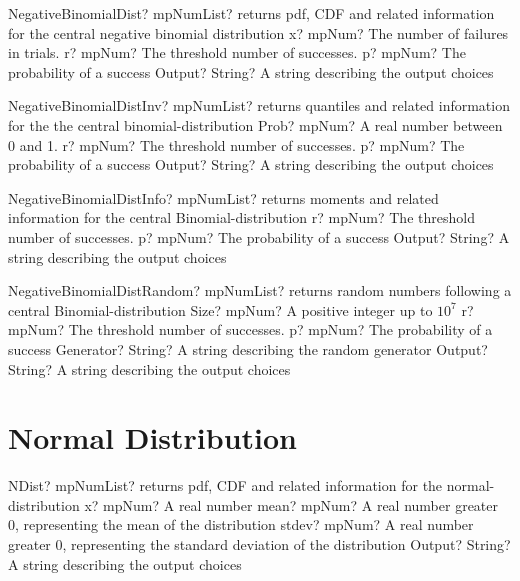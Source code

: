 \documentclass[12pt,a4paper,openany]{book}
\begin{document}
\begin{mpFunctionsExtract}
\mpFunctionFour
{NegativeBinomialDist? mpNumList? returns pdf, CDF and related information for the central negative binomial distribution}
{x? mpNum? The number of failures in trials.}
{r? mpNum? The threshold number of successes.}
{p? mpNum? The probability of a success}
{Output? String? A string describing the output choices}
\end{mpFunctionsExtract}

\begin{mpFunctionsExtract}
\mpFunctionFour
{NegativeBinomialDistInv? mpNumList? returns quantiles and related information for the the central binomial-distribution}
{Prob? mpNum? A real number between 0 and 1.}
{r? mpNum? The threshold number of successes.}
{p? mpNum? The probability of a success}
{Output? String? A string describing the output choices}
\end{mpFunctionsExtract}

\begin{mpFunctionsExtract}
\mpFunctionThree
{NegativeBinomialDistInfo? mpNumList? returns moments and related information for the central Binomial-distribution}
{r? mpNum? The threshold number of successes.}
{p? mpNum? The probability of a success}
{Output? String? A string describing the output choices}
\end{mpFunctionsExtract}

\begin{mpFunctionsExtract}
\mpFunctionFive
{NegativeBinomialDistRandom? mpNumList? returns random numbers following a central Binomial-distribution}
{Size? mpNum? A positive integer up to $10^7$}
{r? mpNum? The threshold number of successes.}
{p? mpNum? The probability of a success}
{Generator? String? A string describing the random generator}
{Output? String? A string describing the output choices}
\end{mpFunctionsExtract}

\section{Normal Distribution}

\begin{mpFunctionsExtract}
\mpFunctionFour
{NDist? mpNumList? returns pdf, CDF and related information for the normal-distribution}
{x? mpNum? A real number}
{mean? mpNum? A real number greater 0, representing the mean of the distribution}
{stdev? mpNum? A real number greater 0, representing the standard deviation of the distribution}
{Output? String? A string describing the output choices}
\end{mpFunctionsExtract}
\end{document}
